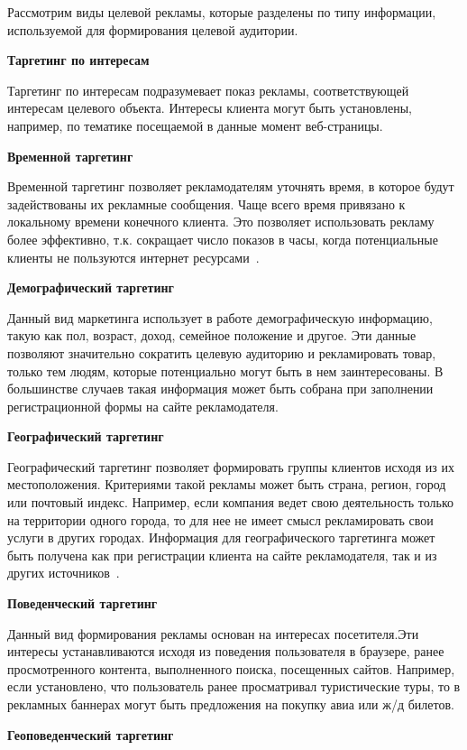 Рассмотрим виды целевой рекламы, которые разделены по типу информации, используемой для формирования целевой аудитории.

\textbf{Таргетинг по интересам}

Таргетинг по интересам подразумевает показ рекламы, соответствующей интересам целевого объекта. Интересы клиента могут быть установлены, например, по тематике посещаемой в данные момент веб-страницы.

\textbf{Временной таргетинг}

Временной таргетинг позволяет рекламодателям уточнять время, в которое будут задействованы их рекламные сообщения. Чаще всего время привязано к локальному времени конечного клиента. Это позволяет использовать рекламу более эффективно, т.к. сокращает число показов в часы, когда потенциальные клиенты не пользуются интернет ресурсами~\cite{timeTargeting1}. 
    
\textbf{Демографический таргетинг}

Данный вид маркетинга использует в работе демографическую информацию, такую как пол, возраст, доход, семейное положение и другое. Эти данные позволяют значительно сократить целевую аудиторию и рекламировать товар, только тем людям, которые потенциально могут быть в нем заинтересованы. В большинстве случаев такая информация может быть собрана при заполнении регистрационной формы на сайте рекламодателя.

\textbf{Географический таргетинг}

Географический таргетинг позволяет формировать группы клиентов исходя из их местоположения. Критериями такой рекламы может быть страна,  регион, город или почтовый индекс. Например, если компания ведет свою деятельность только на территории одного города, то для нее не имеет смысл рекламировать свои услуги в других городах. Информация для географического таргетинга может быть получена как при регистрации клиента на сайте рекламодателя, так и из других источников~\cite{kindOfTarget1}.

\textbf{Поведенческий таргетинг}

Данный вид формирования рекламы основан на интересах посетителя.Эти интересы устанавливаются исходя из поведения пользователя в браузере, ранее просмотренного контента, выполненного поиска, посещенных сайтов. Например, если установлено, что пользователь ранее просматривал туристические туры, то в рекламных баннерах могут быть предложения на покупку авиа или ж/д билетов. 
        
\textbf{Геоповеденческий таргетинг}

